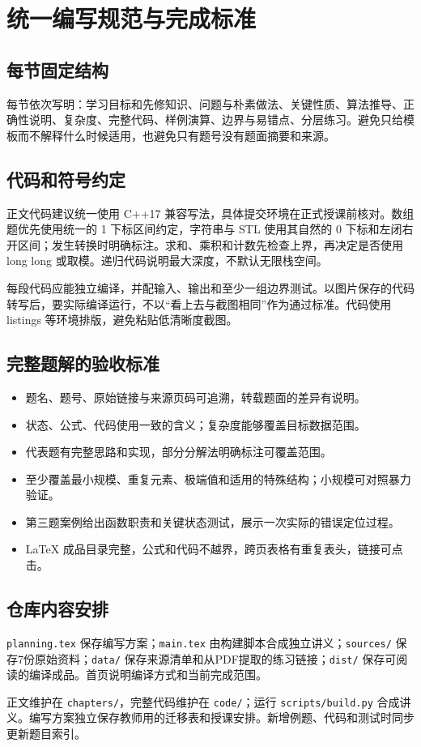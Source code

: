 \documentclass[UTF8,11pt,a4paper,fontset=none]{ctexart}
\begin{document}
\section{统一编写规范与完成标准}
\subsection{每节固定结构}
每节依次写明：学习目标和先修知识、问题与朴素做法、关键性质、算法推导、正确性说明、复杂度、完整代码、样例演算、边界与易错点、分层练习。避免只给模板而不解释什么时候适用，也避免只有题号没有题面摘要和来源。

\subsection{代码和符号约定}
正文代码建议统一使用 C++17 兼容写法，具体提交环境在正式授课前核对。数组题优先使用统一的 1 下标区间约定，字符串与 STL 使用其自然的 0 下标和左闭右开区间；发生转换时明确标注。求和、乘积和计数先检查上界，再决定是否使用 long long 或取模。递归代码说明最大深度，不默认无限栈空间。

每段代码应能独立编译，并配输入、输出和至少一组边界测试。以图片保存的代码转写后，要实际编译运行，不以“看上去与截图相同”作为通过标准。代码使用 listings 等环境排版，避免粘贴低清晰度截图。

\subsection{完整题解的验收标准}
\begin{itemize}
\item 题名、题号、原始链接与来源页码可追溯，转载题面的差异有说明。
\item 状态、公式、代码使用一致的含义；复杂度能够覆盖目标数据范围。
\item 代表题有完整思路和实现，部分分解法明确标注可覆盖范围。
\item 至少覆盖最小规模、重复元素、极端值和适用的特殊结构；小规模可对照暴力验证。
\item 第三题案例给出函数职责和关键状态测试，展示一次实际的错误定位过程。
\item LaTeX 成品目录完整，公式和代码不越界，跨页表格有重复表头，链接可点击。
\end{itemize}

\subsection{仓库内容安排}
\texttt{planning.tex} 保存编写方案；\texttt{main.tex} 由构建脚本合成独立讲义；\texttt{sources/} 保存7份原始资料；\texttt{data/} 保存来源清单和从PDF提取的练习链接；\texttt{dist/} 保存可阅读的编译成品。首页说明编译方式和当前完成范围。

正文维护在 \texttt{chapters/}，完整代码维护在 \texttt{code/}；运行 \texttt{scripts/build.py} 合成讲义。编写方案独立保存教师用的迁移表和授课安排。新增例题、代码和测试时同步更新题目索引。
\end{document}
